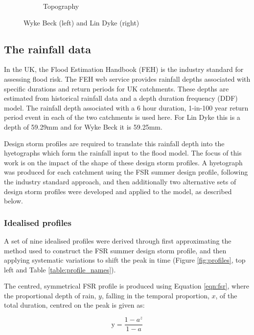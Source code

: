 \documentclass[APA,Times2COL]{WileyNJDv5}
\begin{document}
\begin{figure}[!t]
\begin{subfigure}{0.45\linewidth}
   \caption{Topography}
   \label{fig:catchment_terrain}
\end{subfigure}
\centering
\caption{Wyke Beck (left) and Lin Dyke (right)} \label{fig:catchments} 
\end{figure}



\subsection{The rainfall data}\label{sec:rainfalldata}
In the UK, the Flood Estimation Handbook (FEH) is the industry standard for assessing flood risk. The FEH web service provides rainfall depths associated with specific durations and return periods for UK catchments. These depths are estimated from historical rainfall data and a depth duration frequency (DDF) model. The rainfall depth associated with a 6 hour duration, 1-in-100 year return period event in each of the two catchments is used here. For Lin Dyke this is a depth of 59.29mm and for Wyke Beck it is 59.25mm. 

Design storm profiles are required to translate this rainfall depth into the hyetographs which form the rainfall input to the flood model. The focus of this work is on the impact of the shape of these design storm profiles. A hyetograph was produced for each catchment using the FSR summer design profile, following the industry standard approach, and then additionally two alternative sets of design storm profiles were developed and applied to the model, as described below.

\subsubsection{Idealised profiles}
A set of nine idealised profiles were derived through first approximating the method used to construct the FSR summer design storm profile, and then applying systematic variations to shift the peak in time (Figure \ref{fig:profiles}, top left and Table \ref{table:profile_names}).

The centred, symmetrical FSR profile is produced using Equation \ref{eqn:fsr}, where the proportional depth of rain, $y$, falling in the temporal proportion, $x$, of the total duration, centred on the peak is given as:

\begin{equation}
\text{y} = \frac{1-a^{z}}{1-a}
  \label{eqn:fsr}
\end{equation}
\end{document}
